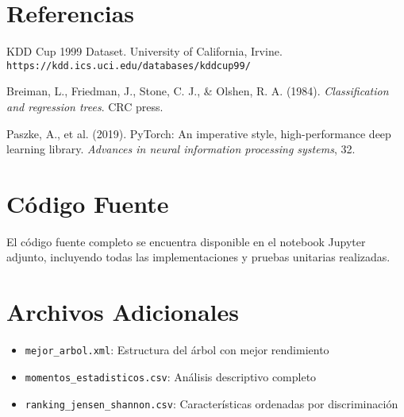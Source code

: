 \documentclass[12pt,a4paper]{article}
\begin{document}
\section{Referencias}

\begin{thebibliography}{9}
KDD Cup 1999 Dataset. University of California, Irvine. 
\texttt{https://kdd.ics.uci.edu/databases/kddcup99/}

Breiman, L., Friedman, J., Stone, C. J., \& Olshen, R. A. (1984). 
\textit{Classification and regression trees}. CRC press.

Paszke, A., et al. (2019). PyTorch: An imperative style, high-performance deep learning library. 
\textit{Advances in neural information processing systems}, 32.
\end{thebibliography}

\appendix

\section{Código Fuente}
El código fuente completo se encuentra disponible en el notebook Jupyter adjunto, incluyendo todas las implementaciones y pruebas unitarias realizadas.

\section{Archivos Adicionales}
\begin{itemize}
    \item \texttt{mejor\_arbol.xml}: Estructura del árbol con mejor rendimiento
    \item \texttt{momentos\_estadisticos.csv}: Análisis descriptivo completo
    \item \texttt{ranking\_jensen\_shannon.csv}: Características ordenadas por discriminación
\end{itemize}
\end{document}

